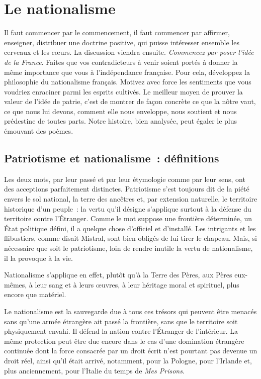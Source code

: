 \documentclass[french,twoside]{book} %
\newcommand{\astermono}{\medskip\centerline{\color{rubric}\large\selectfont{\syms ✻}}\medskip\par}%
\begin{document}
\section[{Le nationalisme}]{Le nationalisme}
\noindent Il faut commencer par le commencement, il faut commencer par affirmer, enseigner, distribuer une doctrine positive, qui puisse intéresser ensemble les cerveaux et les cœurs. La discussion viendra ensuite. \emph{Commencez par poser l’idée de la France}. Faites que vos contradicteurs à venir soient portés à donner la même importance que vous à l’indépendance française. Pour cela, développez la philosophie du nationalisme français. Motivez avec force les sentiments que vous voudriez enraciner parmi les esprits cultivés. Le meilleur moyen de prouver la valeur de l’idée de patrie, c’est de montrer de façon concrète ce que la nôtre vaut, ce que nous lui devons, comment elle nous enveloppe, nous soutient et nous prédestine de toutes parts. Notre histoire, bien analysée, peut égaler le plus émouvant des poèmes.\par

\astermono

\subsection[{Patriotisme et nationalisme : définitions}]{Patriotisme et nationalisme : définitions}
\noindent Les deux mots, par leur passé et par leur étymologie comme par leur sens, ont des acceptions parfaitement distinctes. Patriotisme s’est toujours dit de la piété envers le sol national, la terre des ancêtres et, par extension naturelle, le territoire historique d’un peuple : la vertu qu’il désigne s’applique surtout à la défense du territoire contre l’Étranger. Comme le mot suppose une frontière déterminée, un État politique défini, il a quelque chose d’officiel et d’installé. Les intrigants et les flibustiers, comme disait Mistral, sont bien obligés de lui tirer le chapeau. Mais, si nécessaire que soit le patriotisme, loin de rendre inutile la vertu de nationalisme, il la provoque à la vie.\par
Nationalisme s’applique en effet, plutôt qu’à la Terre des Pères, aux Pères eux-mêmes, à leur sang et à leurs œuvres, à leur héritage moral et spirituel, plus encore que matériel.\par
Le nationalisme est la sauvegarde due à tous ces trésors qui peuvent être menacés sans qu’une armée étrangère ait passé la frontière, sans que le territoire soit physiquement envahi. Il défend la nation contre l’Étranger de l’intérieur. La même protection peut être due encore dans le cas d’une domination étrangère continuée dont la force consacrée par un droit écrit n’est pourtant pas devenue un droit réel, ainsi qu’il était arrivé, notamment, pour la Pologne, pour l’Irlande et, plus anciennement, pour l’Italie du temps de \emph{Mes Prisons}.\par
\end{document}
